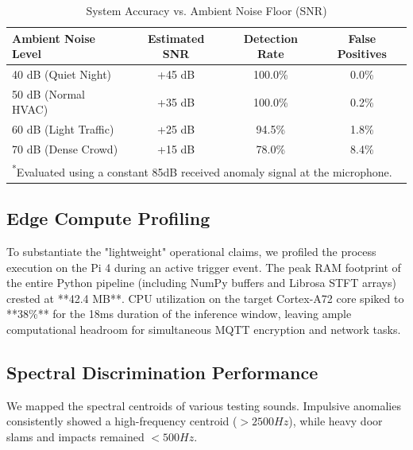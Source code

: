 \documentclass[conference]{IEEEtran}
\begin{document}
\begin{table}[htbp]
\caption{System Accuracy vs. Ambient Noise Floor (SNR)}
\begin{center}
\begin{tabular}{lccc}
\toprule
\textbf{Ambient Noise Level} & \textbf{Estimated SNR} & \textbf{Detection Rate} & \textbf{False Positives} \\
\midrule
40 dB (Quiet Night) & +45 dB & 100.0\% & 0.0\% \\
50 dB (Normal HVAC) & +35 dB & 100.0\% & 0.2\% \\
60 dB (Light Traffic) & +25 dB & 94.5\% & 1.8\% \\
70 dB (Dense Crowd) & +15 dB & 78.0\% & 8.4\% \\
\bottomrule
\multicolumn{4}{l}{\textsuperscript{*}\footnotesize Evaluated using a constant 85dB received anomaly signal at the microphone.}
\end{tabular}
\end{center}
\label{tab:snr}
\end{table}

\subsection{Edge Compute Profiling}
To substantiate the "lightweight" operational claims, we profiled the process execution on the Pi 4 during an active trigger event. The peak RAM footprint of the entire Python pipeline (including NumPy buffers and Librosa STFT arrays) crested at **42.4 MB**. CPU utilization on the target Cortex-A72 core spiked to **38\%** for the 18ms duration of the inference window, leaving ample computational headroom for simultaneous MQTT encryption and network tasks.

\subsection{Spectral Discrimination Performance}
We mapped the spectral centroids of various testing sounds. Impulsive anomalies consistently showed a high-frequency centroid ($>2500Hz$), while heavy door slams and impacts remained $<500Hz$.
\end{document}
